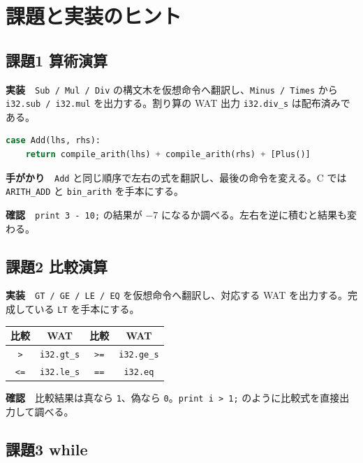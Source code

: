 \documentclass[a4paper,11pt]{ltjsarticle}
\newcommand{\task}[1]{\textbf{\color{Orange}#1}}
\begin{document}
\section{課題と実装のヒント}

\subsection{課題1 算術演算}

\task{実装}　\texttt{Sub / Mul / Div} の構文木を仮想命令へ翻訳し、\texttt{Minus / Times} から \texttt{i32.sub / i32.mul} を出力する。割り算の WAT 出力 \texttt{i32.div\_s} は配布済みである。

\begin{lstlisting}[language=Python]
case Add(lhs, rhs):
    return compile_arith(lhs) + compile_arith(rhs) + [Plus()]
\end{lstlisting}

\textbf{手がかり}　\texttt{Add} と同じ順序で左右の式を翻訳し、最後の命令を変える。C では \texttt{ARITH\_ADD} と \texttt{bin\_arith} を手本にする。

\textbf{確認}　\texttt{print 3 - 10;} の結果が \(-7\) になるか調べる。左右を逆に積むと結果も変わる。

\subsection{課題2 比較演算}

\task{実装}　\texttt{GT / GE / LE / EQ} を仮想命令へ翻訳し、対応する WAT を出力する。完成している \texttt{LT} を手本にする。

\begin{center}
\begin{tabular}{cc@{\qquad}cc}
\toprule
比較 & WAT & 比較 & WAT \\
\midrule
\texttt{>} & \texttt{i32.gt\_s} & \texttt{>=} & \texttt{i32.ge\_s} \\
\texttt{<=} & \texttt{i32.le\_s} & \texttt{==} & \texttt{i32.eq} \\
\bottomrule
\end{tabular}
\end{center}

\textbf{確認}　比較結果は真なら \texttt{1}、偽なら \texttt{0}。\texttt{print i > 1;} のように比較式を直接出力して調べる。

\clearpage
\subsection{課題3 while}
\end{document}

